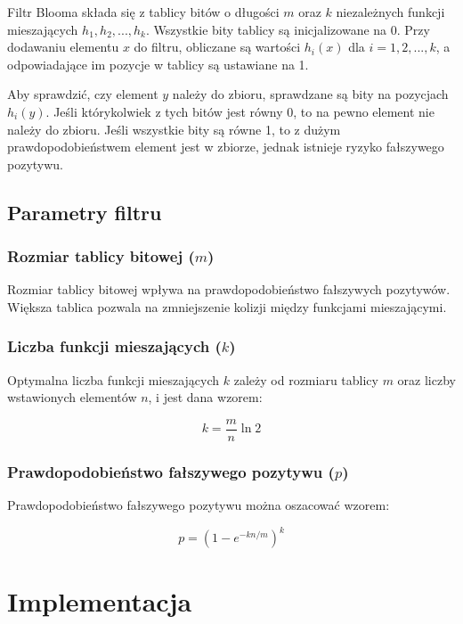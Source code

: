\documentclass{article}
\begin{document}
Filtr Blooma składa się z tablicy bitów o długości $m$ oraz $k$ niezależnych funkcji mieszających $h_1, h_2, ..., h_k$. Wszystkie bity tablicy są inicjalizowane na 0. Przy dodawaniu elementu $x$ do filtru, obliczane są wartości $h_i(x)$ dla $i = 1, 2, ..., k$, a odpowiadające im pozycje w tablicy są ustawiane na 1.

Aby sprawdzić, czy element $y$ należy do zbioru, sprawdzane są bity na pozycjach $h_i(y)$. Jeśli którykolwiek z tych bitów jest równy 0, to na pewno element nie należy do zbioru. Jeśli wszystkie bity są równe 1, to z dużym prawdopodobieństwem element jest w zbiorze, jednak istnieje ryzyko fałszywego pozytywu.

\subsection{Parametry filtru}

\subsubsection{Rozmiar tablicy bitowej ($m$)}

Rozmiar tablicy bitowej wpływa na prawdopodobieństwo fałszywych pozytywów. Większa tablica pozwala na zmniejszenie kolizji między funkcjami mieszającymi.

\subsubsection{Liczba funkcji mieszających ($k$)}

Optymalna liczba funkcji mieszających $k$ zależy od rozmiaru tablicy $m$ oraz liczby wstawionych elementów $n$, i jest dana wzorem:

\begin{equation}
k = \frac{m}{n} \ln 2
\end{equation}

\subsubsection{Prawdopodobieństwo fałszywego pozytywu ($p$)}

Prawdopodobieństwo fałszywego pozytywu można oszacować wzorem:

\begin{equation}
p = \left(1 - e^{-kn/m}\right)^k
\end{equation}

\newpage

\section{Implementacja}
\end{document}
